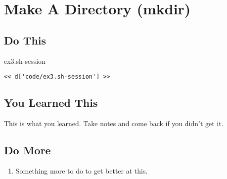 \chapter{Make A Directory (mkdir)}

\section{Do This}

\begin{code}{ex3.sh-session}
\begin{Verbatim}
<< d['code/ex3.sh-session'] >>
\end{Verbatim}
\end{code}


\section{You Learned This}

This is what you learned.  Take notes and come back if you didn't get it.

\section{Do More}

\begin{enumerate}
\item Something more to do to get better at this.
\end{enumerate}

